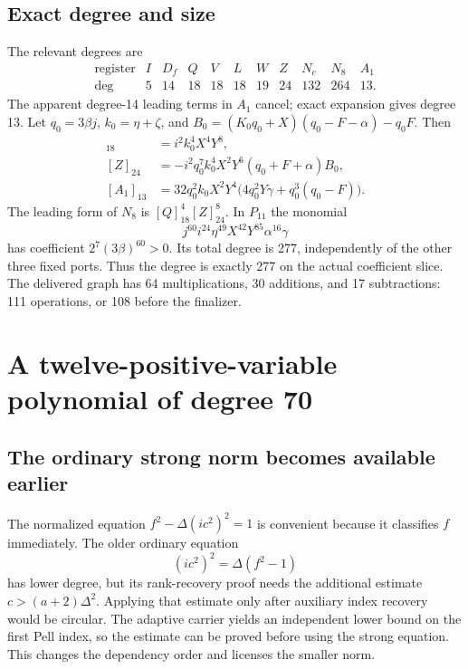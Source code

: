 \documentclass[11pt]{article}
\theoremstyle{definition}
\theoremstyle{remark}
\begin{document}
\subsection{Exact degree and size}

The relevant degrees are
\[
\begin{array}{c|rrrrrrrrrr}
\text{register}&I&D_f&Q&V&L&W&Z&N_c&N_8&A_1\\\hline
\deg&5&14&18&18&18&19&24&132&264&13.
\end{array}
\]
The apparent degree-14 leading terms in $A_1$ cancel; exact expansion gives
degree 13. Let $q_0=3\beta j$, $k_0=\eta+\zeta$, and
$B_0=(K_0q_0+X)(q_0-F-\alpha)-q_0F$. Then
\begin{align*}
 [Q]_{18}&=i^2k_0^4X^4Y^8,\\
 [Z]_{24}&=-i^2q_0^7k_0^4X^2Y^6(q_0+F+\alpha)B_0,\\
 [A_1]_{13}&=32q_0^2k_0X^2Y^4
    \bigl(4q_0^2Y\gamma+q_0^3(q_0-F)\bigr).
\end{align*}
The leading form of $N_8$ is $[Q]_{18}^4[Z]_{24}^8$. In $P_{11}$ the
monomial
\[
 j^{60}i^{24}\eta^{49}X^{42}Y^{85}\alpha^{16}\gamma
\]
has coefficient $2^7(3\beta)^{60}>0$. Its total degree is 277, independently
of the other three fixed ports. Thus the degree is exactly 277 on the actual
coefficient slice. The delivered graph has 64 multiplications, 30 additions,
and 17 subtractions: 111 operations, or 108 before the finalizer.

\section{A twelve-positive-variable polynomial of degree 70}\label{sec:twelve}

\subsection{The ordinary strong norm becomes available earlier}

The normalized equation $f^2-\Delta(ic^2)^2=1$ is convenient because it
classifies $f$ immediately. The older ordinary equation
\[
 (ic^2)^2=\Delta(f^2-1)
\]
has lower degree, but its rank-recovery proof needs the additional estimate
$c>(a+2)\Delta^2$. Applying that estimate only after auxiliary index
recovery would be circular. The adaptive carrier yields an independent
lower bound on the first Pell index, so the estimate can be proved before
using the strong equation. This changes the dependency order and licenses
the smaller norm.
\end{document}
